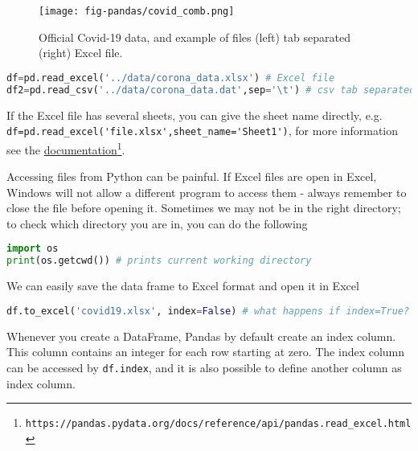 \documentclass[graybox,sectrefs,envcountresetchap,open=right,final]{svmonodo}
\newenvironment{graybox2admon}[1][]{
\begin{graybox2mdframed}[frametitle=#1]
}
{
\end{graybox2mdframed}
}
\begin{document}
\begin{figure}[!ht]  %
  \centerline{\texttt{[image: fig-pandas/covid\_comb.png]}}
  \caption{
  Official Covid-19 data, and example of files (left) tab separated (right) Excel file. \label{fig:file}
  }
\end{figure}




\begin{lstlisting}[language=python,style=blue1bar]
df=pd.read_excel('../data/corona_data.xlsx') # Excel file
df2=pd.read_csv('../data/corona_data.dat',sep='\t') # csv tab separated file

\end{lstlisting}

If the Excel file has several sheets, you can give the sheet name directly, e.g. \Verb!df=pd.read_excel('file.xlsx',sheet_name='Sheet1')!, for more information see the \href{{https://pandas.pydata.org/docs/reference/api/pandas.read_excel.html}}{documentation}\footnote{\texttt{https://pandas.pydata.org/docs/reference/api/pandas.read\_excel.html}}. 



\begin{graybox2admon}[Accessing files]
Accessing files from Python can be painful. If Excel files are open in Excel, Windows will not allow a different program to access them - always remember to close the file before opening it. Sometimes we may not be in the right directory; to check which directory you are in, you can do the following



\begin{lstlisting}[language=python,style=blue1bar]
import os
print(os.getcwd()) # prints current working directory

\end{lstlisting}
\end{graybox2admon}




We can easily save the data frame to Excel format and open it in Excel


\begin{lstlisting}[language=python,style=blue1bar]
df.to_excel('covid19.xlsx', index=False) # what happens if index=True?

\end{lstlisting}




\begin{graybox2admon}[Index column]
Whenever you create a DataFrame, Pandas by default create an index column. This column contains an integer for each row starting at zero. The index column can be accessed by \texttt{df.index}, and it is also possible to define another column as index column.
\end{graybox2admon}
\end{document}
